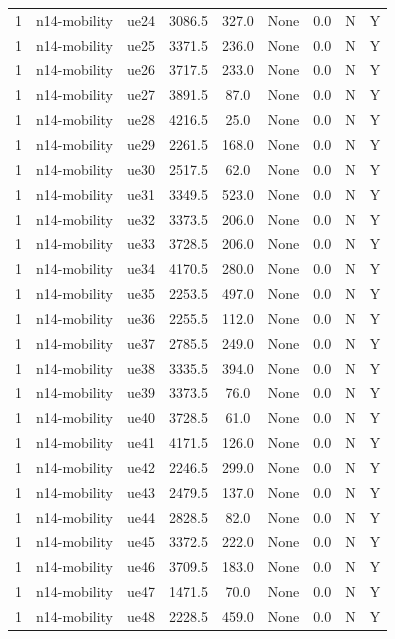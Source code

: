 \begin{table}[ht]
\begin{tabular}{|c|c|c|c|c|c|c|c|c|}
1 & n14-mobility & ue24 & 3086.5 & 327.0 & None & 0.0 & N & Y \\
1 & n14-mobility & ue25 & 3371.5 & 236.0 & None & 0.0 & N & Y \\
1 & n14-mobility & ue26 & 3717.5 & 233.0 & None & 0.0 & N & Y \\
1 & n14-mobility & ue27 & 3891.5 & 87.0 & None & 0.0 & N & Y \\
1 & n14-mobility & ue28 & 4216.5 & 25.0 & None & 0.0 & N & Y \\
1 & n14-mobility & ue29 & 2261.5 & 168.0 & None & 0.0 & N & Y \\
1 & n14-mobility & ue30 & 2517.5 & 62.0 & None & 0.0 & N & Y \\
1 & n14-mobility & ue31 & 3349.5 & 523.0 & None & 0.0 & N & Y \\
1 & n14-mobility & ue32 & 3373.5 & 206.0 & None & 0.0 & N & Y \\
1 & n14-mobility & ue33 & 3728.5 & 206.0 & None & 0.0 & N & Y \\
1 & n14-mobility & ue34 & 4170.5 & 280.0 & None & 0.0 & N & Y \\
1 & n14-mobility & ue35 & 2253.5 & 497.0 & None & 0.0 & N & Y \\
1 & n14-mobility & ue36 & 2255.5 & 112.0 & None & 0.0 & N & Y \\
1 & n14-mobility & ue37 & 2785.5 & 249.0 & None & 0.0 & N & Y \\
1 & n14-mobility & ue38 & 3335.5 & 394.0 & None & 0.0 & N & Y \\
1 & n14-mobility & ue39 & 3373.5 & 76.0 & None & 0.0 & N & Y \\
1 & n14-mobility & ue40 & 3728.5 & 61.0 & None & 0.0 & N & Y \\
1 & n14-mobility & ue41 & 4171.5 & 126.0 & None & 0.0 & N & Y \\
1 & n14-mobility & ue42 & 2246.5 & 299.0 & None & 0.0 & N & Y \\
1 & n14-mobility & ue43 & 2479.5 & 137.0 & None & 0.0 & N & Y \\
1 & n14-mobility & ue44 & 2828.5 & 82.0 & None & 0.0 & N & Y \\
1 & n14-mobility & ue45 & 3372.5 & 222.0 & None & 0.0 & N & Y \\
1 & n14-mobility & ue46 & 3709.5 & 183.0 & None & 0.0 & N & Y \\
1 & n14-mobility & ue47 & 1471.5 & 70.0 & None & 0.0 & N & Y \\
1 & n14-mobility & ue48 & 2228.5 & 459.0 & None & 0.0 & N & Y \\

\end{tabular}
\end{table}

